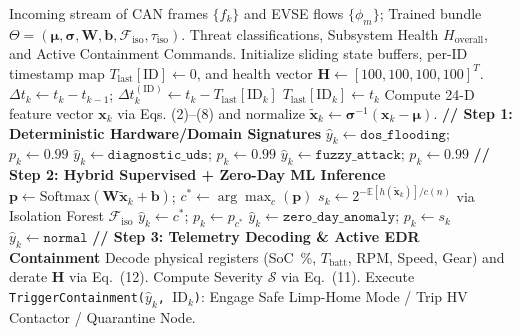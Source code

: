 \documentclass[conference]{IEEEtran}
\begin{document}
\begin{algorithm}[!t]
\caption{EVSentinel Dual-Layer Real-Time Detection, Health Decoding, and Automated EDR Containment}
\label{alg:evsentinel}
\begin{algorithmic}[1]
\REQUIRE Incoming stream of CAN frames $\{f_k\}$ and EVSE flows $\{\phi_m\}$; Trained bundle $\Theta = (\boldsymbol{\mu}, \boldsymbol{\sigma}, \mathbf{W}, \mathbf{b}, \mathcal{F}_{\text{iso}}, \tau_{\text{iso}})$.
\ENSURE Threat classifications, Subsystem Health $H_{\text{overall}}$, and Active Containment Commands.
\STATE Initialize sliding state buffers, per-ID timestamp map $T_{\text{last}}[\text{ID}] \leftarrow 0$, and health vector $\mathbf{H} \leftarrow [100, 100, 100, 100]^T$.
    \STATE $\Delta t_k \leftarrow t_k - t_{k-1}$; \quad $\Delta t_k^{(\text{ID})} \leftarrow t_k - T_{\text{last}}[\text{ID}_k]$
    \STATE $T_{\text{last}}[\text{ID}_k] \leftarrow t_k$
    \STATE Compute 24-D feature vector $\mathbf{x}_k$ via Eqs. (2)--(8) and normalize $\tilde{\mathbf{x}}_k \leftarrow \boldsymbol{\sigma}^{-1}(\mathbf{x}_k - \boldsymbol{\mu})$.
    \STATE \textbf{// Step 1: Deterministic Hardware/Domain Signatures}
        \STATE $\hat{y}_k \leftarrow \texttt{dos\_flooding}$; \quad $p_k \leftarrow 0.99$
        \STATE $\hat{y}_k \leftarrow \texttt{diagnostic\_uds}$; \quad $p_k \leftarrow 0.99$
        \STATE $\hat{y}_k \leftarrow \texttt{fuzzy\_attack}$; \quad $p_k \leftarrow 0.99$
    \ELSE
        \STATE \textbf{// Step 2: Hybrid Supervised + Zero-Day ML Inference}
        \STATE $\mathbf{p} \leftarrow \text{Softmax}(\mathbf{W}\tilde{\mathbf{x}}_k + \mathbf{b})$; \quad $c^* \leftarrow \arg\max_c(\mathbf{p})$
        \STATE $s_k \leftarrow 2^{-\mathbb{E}[h(\tilde{\mathbf{x}}_k)] / c(n)}$ via Isolation Forest $\mathcal{F}_{\text{iso}}$
            \STATE $\hat{y}_k \leftarrow c^*$; \quad $p_k \leftarrow p_{c^*}$
            \STATE $\hat{y}_k \leftarrow \texttt{zero\_day\_anomaly}$; \quad $p_k \leftarrow s_k$
        \ELSE
            \STATE $\hat{y}_k \leftarrow \texttt{normal}$
        \ENDIF
    \ENDIF
    \STATE \textbf{// Step 3: Telemetry Decoding \& Active EDR Containment}
        \STATE Decode physical registers (SoC~\%, $T_{\text{batt}}$, RPM, Speed, Gear) and derate $\mathbf{H}$ via Eq.~(12).
        \STATE Compute Severity $\mathcal{S}$ via Eq.~(11).
            \STATE Execute \texttt{TriggerContainment($\hat{y}_k$, $\text{ID}_k$)}: Engage Safe Limp-Home Mode / Trip HV Contactor / Quarantine Node.
        \ENDIF
    \ENDIF
\ENDFOR
\end{algorithmic}
\end{algorithm}
\end{document}
